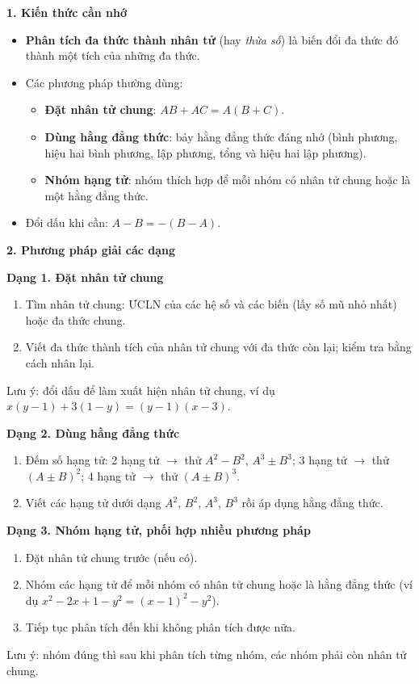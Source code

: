 \textbf{1. Kiến thức cần nhớ}
\begin{itemize}
\item \textbf{Phân tích đa thức thành nhân tử} (hay \textit{thừa số}) là biến đổi đa thức đó thành một tích của những đa thức.
\item Các phương pháp thường dùng:
\begin{itemize}
\item \textbf{Đặt nhân tử chung}: $AB+AC=A(B+C)$.
\item \textbf{Dùng hằng đẳng thức}: bảy hằng đẳng thức đáng nhớ (bình phương, hiệu hai bình phương, lập phương, tổng và hiệu hai lập phương).
\item \textbf{Nhóm hạng tử}: nhóm thích hợp để mỗi nhóm có nhân tử chung hoặc là một hằng đẳng thức.
\end{itemize}
\item Đổi dấu khi cần: $A-B=-(B-A)$.
\end{itemize}

\textbf{2. Phương pháp giải các dạng}

\textbf{Dạng 1. Đặt nhân tử chung}
\begin{enumerate}
\item Tìm nhân tử chung: ƯCLN của các hệ số và các biến (lấy số mũ nhỏ nhất) hoặc đa thức chung.
\item Viết đa thức thành tích của nhân tử chung với đa thức còn lại; kiểm tra bằng cách nhân lại.
\end{enumerate}
Lưu ý: đổi dấu để làm xuất hiện nhân tử chung, ví dụ $x(y-1)+3(1-y)=(y-1)(x-3)$.

\textbf{Dạng 2. Dùng hằng đẳng thức}
\begin{enumerate}
\item Đếm số hạng tử: 2 hạng tử $\to$ thử $A^2-B^2$, $A^3\pm B^3$; 3 hạng tử $\to$ thử $(A\pm B)^2$; 4 hạng tử $\to$ thử $(A\pm B)^3$.
\item Viết các hạng tử dưới dạng $A^2$, $B^2$, $A^3$, $B^3$ rồi áp dụng hằng đẳng thức.
\end{enumerate}

\textbf{Dạng 3. Nhóm hạng tử, phối hợp nhiều phương pháp}
\begin{enumerate}
\item Đặt nhân tử chung trước (nếu có).
\item Nhóm các hạng tử để mỗi nhóm có nhân tử chung hoặc là hằng đẳng thức (ví dụ $x^2-2x+1-y^2=(x-1)^2-y^2$).
\item Tiếp tục phân tích đến khi không phân tích được nữa.
\end{enumerate}
Lưu ý: nhóm đúng thì sau khi phân tích từng nhóm, các nhóm phải còn nhân tử chung.

